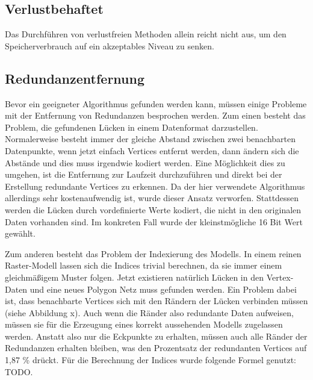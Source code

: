 \subsection{Verlustbehaftet}
Das Durchführen von verlustfreien Methoden allein reicht nicht aus, um den Speicherverbrauch auf ein akzeptables Niveau zu senken.


\subsection{Redundanzentfernung}\label{redundanzberechnung}
Bevor ein geeigneter Algorithmus gefunden werden kann, müssen einige Probleme mit der Entfernung von Redundanzen besprochen werden. Zum einen besteht das Problem, die gefundenen Lücken in einem Datenformat darzustellen. Normalerweise besteht immer der gleiche Abstand zwischen zwei benachbarten Datenpunkte, wenn jetzt einfach Vertices entfernt werden, dann ändern sich die Abstände und dies muss irgendwie kodiert werden. Eine Möglichkeit dies zu umgehen, ist die Entfernung zur Laufzeit durchzuführen und direkt bei der Erstellung redundante Vertices zu erkennen. Da der hier verwendete Algorithmus allerdings sehr kostenaufwendig ist, wurde dieser Ansatz verworfen. Stattdessen werden die Lücken durch vordefinierte Werte kodiert, die nicht in den originalen Daten vorhanden sind. Im konkreten Fall wurde der kleinstmögliche 16 Bit Wert gewählt.

Zum anderen besteht das Problem der Indexierung des Modells. In einem reinen Raster-Modell lassen sich die Indices trivial berechnen, da sie immer einem gleichmäßigem Muster folgen. Jetzt existieren natürlich Lücken in den Vertex-Daten und eine neues Polygon Netz muss gefunden werden. Ein Problem dabei ist, dass benachbarte Vertices sich mit den Rändern der Lücken verbinden müssen (siehe Abbildung x). Auch wenn die Ränder also redundante Daten aufweisen, müssen sie für die Erzeugung eines korrekt aussehenden Modells zugelassen werden. Anstatt also nur die Eckpunkte zu erhalten, müssen auch alle Ränder der Redundanzen erhalten bleiben, was den Prozentsatz der redundanten Vertices auf 1,87 \% drückt. Für die Berechnung der Indices wurde folgende Formel genutzt: TODO.


